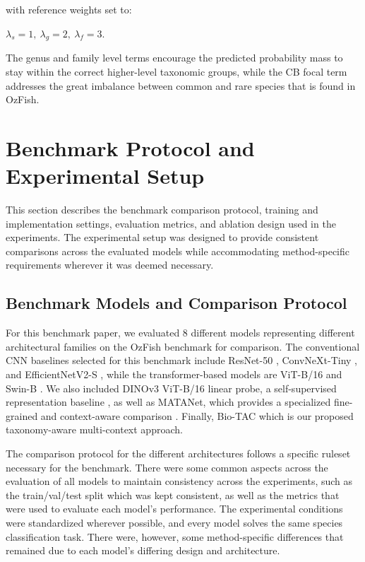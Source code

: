 \documentclass[preprint,12pt]{elsarticle}
\begin{document}
with reference weights set to:

\(\lambda_{s} = 1,\ \lambda_{g} = 2,\ \lambda_{f} = 3\).

The genus and family level terms encourage the predicted probability
mass to stay within the correct higher-level taxonomic groups, while the
CB focal term addresses the great imbalance between common and rare
species that is found in OzFish.

\section{Benchmark Protocol and Experimental
Setup}\label{benchmark-protocol-and-experimental-setup}

This section describes the benchmark comparison protocol, training and
implementation settings, evaluation metrics, and ablation design used in
the experiments. The experimental setup was designed to provide
consistent comparisons across the evaluated models while accommodating
method-specific requirements wherever it was deemed necessary.

\subsection{Benchmark Models and Comparison
Protocol}\label{benchmark-models-and-comparison-protocol}

For this benchmark paper, we evaluated 8 different models representing
different architectural families on the OzFish benchmark for comparison.
The conventional CNN baselines selected for this benchmark include
ResNet-50 \citep{ref39}, ConvNeXt-Tiny
\citep{ref41}, and EfficientNetV2-S
\citep{ref40}, while the transformer-based models
are ViT-B/16 \citep{ref36} and Swin-B
\citep{ref38}. We also included DINOv3 ViT-B/16
linear probe, a self-supervised representation baseline
\citep{ref25}, as well as MATANet, which provides
a specialized fine-grained and context-aware comparison
\citep{ref26}. Finally, Bio-TAC which is our
proposed taxonomy-aware multi-context approach.

The comparison protocol for the different architectures follows a
specific ruleset necessary for the benchmark. There were some common
aspects across the evaluation of all models to maintain consistency
across the experiments, such as the train/val/test split which was kept
consistent, as well as the metrics that were used to evaluate each
model's performance. The experimental conditions were standardized
wherever possible, and every model solves the same species
classification task. There were, however, some method-specific
differences that remained due to each model's differing design and
architecture.
\end{document}
